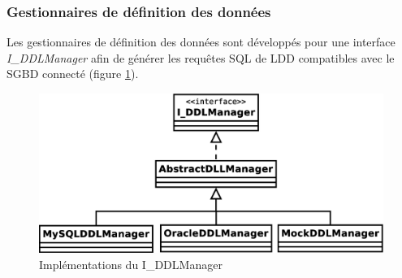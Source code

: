 \subsubsection{Gestionnaires de définition des données}
Les gestionnaires de définition des données sont développés pour une interface \textit{I\_DDLManager} afin de générer les requêtes SQL de LDD compatibles avec le SGBD connecté (figure \ref{ddl_managers_uml}).

\begin{figure}[H]
\centering
\includegraphics[width=14cm]{images/ddl_managers.eps}
\caption{Implémentations du I\_DDLManager}
\label{ddl_managers_uml}
\end{figure}
